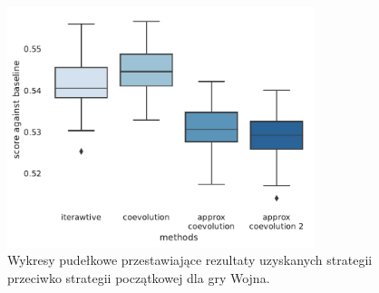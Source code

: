 \documentclass[inzynierska]{pwr_wmat_praca_dyplomowa}
\theoremstyle{plain}
\numberwithin{theorem}{chapter}
\theoremstyle{definition}
\numberwithin{theorem}{chapter}
\begin{document}
	\begin{figure}
		\centering
		\includegraphics[width=0.8\textwidth]{imagens/war_results.pdf}
		\caption{Wykresy pudełkowe przestawiające rezultaty uzyskanych strategii przeciwko strategii początkowej dla gry Wojna.}
		\label{fig:war_results}
	\end{figure}
\end{document}
